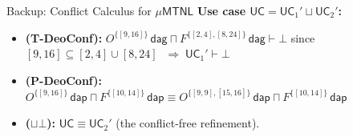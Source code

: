 \documentclass[9pt,aspectratio=169]{beamer}
\newcommand{\logic}[1]{\ensuremath{\mathsf{#1}}\xspace}
\newcommand{\TDDLfm}{\logic{\mu MTNL}}
\newcommand{\delAtGate}{\ensuremath{\mathsf{dag}}\xspace}
\newcommand{\delAtPark}{\ensuremath{\mathsf{dap}}\xspace}
\newcommand{\UC}{\ensuremath{\mathsf{UC}}\xspace}
\newcommand{\ob}[2]{\ensuremath{O^{#1}\,#2}}
\newcommand{\forbb}[2]{\ensuremath{F^{#1}\,#2}}
\begin{document}
\begin{frame}{Backup: Conflict Calculus for $\TDDLfm$}
\vspace{2mm}
\textbf{Use case $\UC = \UC_1' \sqcup \UC_2'$:}
\begin{itemize}
  \item \textbf{(T-DeoConf):} $\ob{\{[9,16]\}}{\delAtGate} \sqcap \forbb{\{[2,4],[8,24]\}}{\delAtGate} \vdash \bot$
  since $[9,16]\subseteq [2,4]\cup[8,24]$
  $\;\Rightarrow\; \UC_1' \vdash \bot$
  \item \textbf{(P-DeoConf):} $\ob{\{[9,16]\}}{\delAtPark} \sqcap \forbb{\{[10,14]\}}{\delAtPark} \equiv \ob{\{[9,9],[15,16]\}}{\delAtPark} \sqcap \forbb{\{[10,14]\}}{\delAtPark}$
  \item \textbf{($\bm{\sqcup\bot}$):} $\UC \equiv \UC_2'$ (the conflict-free refinement).
\end{itemize}
\end{frame}
\end{document}
